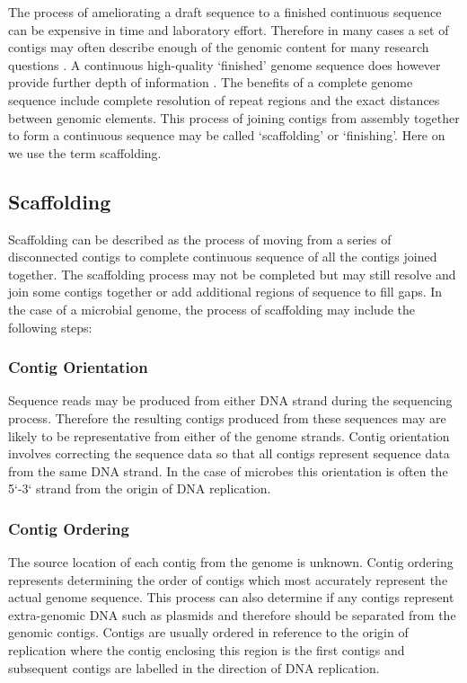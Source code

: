\documentclass[10pt]{bmc_article}
\newenvironment{bmcformat}{\begin{raggedright}\baselineskip20pt\sloppy\setboolean{publ}{false}}{\end{raggedright}\baselineskip20pt\sloppy}
\begin{document}
\begin{bmcformat}
The process of ameliorating a draft sequence to a finished continuous sequence
can be expensive in time and laboratory effort. Therefore in many cases a set
of contigs may often describe enough of the genomic content for many research
questions \cite{branscomb2002}. A continuous high-quality `finished' genome
sequence does however provide further depth of information
\cite{parkhill2002,fraser2002}. The benefits of a complete genome sequence
include complete resolution of repeat regions and the exact distances between
genomic elements. This process of joining contigs from assembly together to form
a continuous sequence may be called `scaffolding' or `finishing'. Here on we
use the term scaffolding. \pb

\subsection*{Scaffolding} %

Scaffolding can be described as the process of moving from a series of
disconnected contigs to complete continuous sequence of all the contigs joined
together. The scaffolding process may not be completed but may still resolve
and join some contigs together or add additional regions of sequence to fill
gaps. In the case of a microbial genome, the process of scaffolding may
include the following steps:

\subsubsection*{Contig Orientation} %

Sequence reads may be produced from either DNA strand during the sequencing
process. Therefore the resulting contigs produced from these sequences may are
likely to be representative from either of the genome strands. Contig
orientation involves correcting the sequence data so that all contigs
represent sequence data from the same DNA strand. In the case of microbes this
orientation is often the 5`-3` strand from the origin of DNA replication.

\subsubsection*{Contig Ordering} %

The source location of each contig from the genome is unknown. Contig ordering
represents determining the order of contigs which most accurately represent
the actual genome sequence. This process can also determine if any contigs
represent extra-genomic DNA such as plasmids and therefore should be separated
from the genomic contigs. Contigs are usually ordered in reference to the
origin of replication where the contig enclosing this region is the first
contigs and subsequent contigs are labelled in the direction of DNA
replication.


\end{bmcformat}
\end{document}
